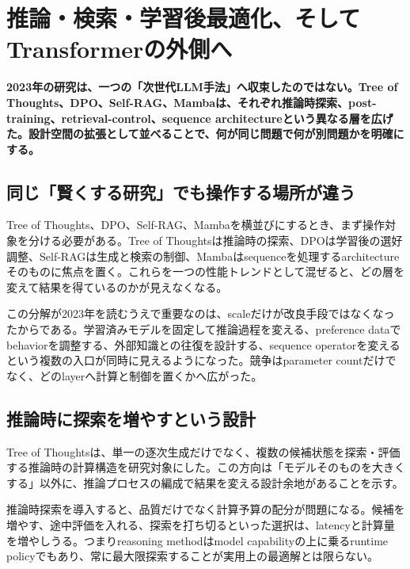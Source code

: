 \section{推論・検索・学習後最適化、そしてTransformerの外側へ}
\noindent\textbf{2023年の研究は、一つの「次世代LLM手法」へ収束したのではない。Tree of Thoughts、DPO、Self-RAG、Mambaは、それぞれ推論時探索、post-training、retrieval-control、sequence architectureという異なる層を広げた。設計空間の拡張として並べることで、何が同じ問題で何が別問題かを明確にする。}\autocite{src-21aef0026892,src-5dd64e15cc75,src-8a38211129c4,src-e413c7ab8da4}

\subsection{同じ「賢くする研究」でも操作する場所が違う}

Tree of Thoughts、DPO、Self-RAG、Mambaを横並びにするとき、まず操作対象を分ける必要がある。Tree of Thoughtsは推論時の探索、DPOは学習後の選好調整、Self-RAGは生成と検索の制御、Mambaはsequenceを処理するarchitectureそのものに焦点を置く。これらを一つの性能トレンドとして混ぜると、どの層を変えて結果を得ているのかが見えなくなる。\autocite{src-21aef0026892,src-5dd64e15cc75,src-8a38211129c4,src-e413c7ab8da4}


この分解が2023年を読むうえで重要なのは、scaleだけが改良手段ではなくなったからである。学習済みモデルを固定して推論過程を変える、preference dataでbehaviorを調整する、外部知識との往復を設計する、sequence operatorを変えるという複数の入口が同時に見えるようになった。競争はparameter countだけでなく、どのlayerへ計算と制御を置くかへ広がった。\autocite{src-21aef0026892,src-5dd64e15cc75,src-8a38211129c4,src-e413c7ab8da4}


\subsection{推論時に探索を増やすという設計}

Tree of Thoughtsは、単一の逐次生成だけでなく、複数の候補状態を探索・評価する推論時の計算構造を研究対象にした。この方向は「モデルそのものを大きくする」以外に、推論プロセスの編成で結果を変える設計余地があることを示す。\autocite{src-8a38211129c4}


推論時探索を導入すると、品質だけでなく計算予算の配分が問題になる。候補を増やす、途中評価を入れる、探索を打ち切るといった選択は、latencyと計算量を増やしうる。つまりreasoning methodはmodel capabilityの上に乗るruntime policyでもあり、常に最大限探索することが実用上の最適解とは限らない。\autocite{src-8a38211129c4}


